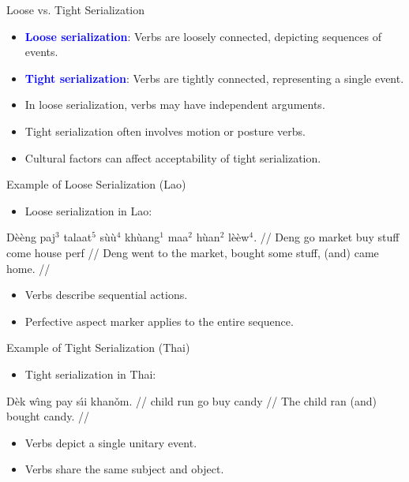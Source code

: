 \documentclass{beamer}
\newcommand{\txx}[1]{\textcolor{blue}{\textbf{#1}}}
\begin{document}
\begin{frame}{Loose vs. Tight Serialization}
\begin{itemize}
    \item \txx{Loose serialization}: Verbs are loosely connected, depicting sequences of events.
    \item \txx{Tight serialization}: Verbs are tightly connected, representing a single event.
    \item In loose serialization, verbs may have independent arguments.
    \item Tight serialization often involves motion or posture verbs.
    \item Cultural factors can affect acceptability of tight serialization.
\end{itemize}
\end{frame}

\begin{frame}{Example of Loose Serialization (Lao)}
\begin{itemize}
    \item Loose serialization in Lao:
\end{itemize}
\ex
\begingl
\gla Dèèng paj$^3$ talaat$^5$ sùù$^4$ khùang$^1$ maa$^2$ hùan$^2$ lèèw$^4$. //
\glb Deng go market buy stuff come house perf //
\glft Deng went to the market, bought some stuff, (and) came home. //
\endgl
\xe
\begin{itemize}
    \item Verbs describe sequential actions.
    \item Perfective aspect marker applies to the entire sequence.
\end{itemize}
\end{frame}

\begin{frame}{Example of Tight Serialization (Thai)}
\begin{itemize}
    \item Tight serialization in Thai:
\end{itemize}
\ex
\begingl
\gla Dèk wı̂ng pay sı́i khanǒm. //
\glb child run go buy candy //
\glft The child ran (and) bought candy. //
\endgl
\xe
\begin{itemize}
    \item Verbs depict a single unitary event.
    \item Verbs share the same subject and object.
\end{itemize}
\end{frame}
\end{document}
